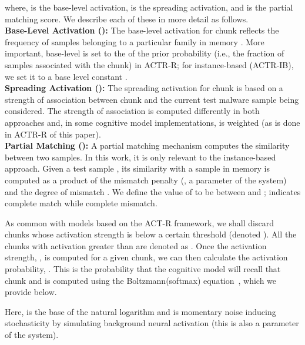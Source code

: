 \documentclass[conference]{IEEEtran}
\begin{document}
where,  is the base-level activation,  is the spreading activation, and  is the partial matching score.  We describe each of these in more detail as follows.\\
{\bf Base-Level Activation ():}
The base-level activation for chunk  reflects the frequency of samples belonging to a particular family in memory . More important, base-level is set to the  of the prior probability (i.e., the fraction of samples associated with the chunk) in ACTR-R; for instance-based (ACTR-IB), we set it to a base level constant .\\ 
{\bf Spreading Activation ():}
The spreading activation for chunk  is based on a strength of association between chunk  and the current test malware sample being considered.  The strength of association is computed differently in both approaches and, in some cognitive model implementations, is weighted (as is done in ACTR-R of this paper).\\
{\bf Partial Matching ():}
A partial matching mechanism computes the similarity between two samples.  In this work, it is only relevant to the instance-based approach. Given a test sample , its similarity with a sample  in memory is computed as a product of the mismatch penalty (, a parameter of the system) and the degree of mismatch .  We define the value of  to be between  and ;  indicates complete match while  complete mismatch.

As common with models based on the ACT-R framework, we shall discard chunks whose activation strength is below a certain threshold (denoted ). All the chunks with activation greater than  are denoted as . Once the activation strength, , is computed for a given chunk, we can then calculate the activation probability, .  This is the probability that the cognitive model will recall that chunk and is computed using the Boltzmann(softmax) equation~\cite{Sutton:1998}, which we provide below.

Here,  is the base of the natural logarithm and  is momentary noise inducing stochasticity by simulating background neural activation (this is also a parameter of the system).  
\vspace{0em}
\end{document}
